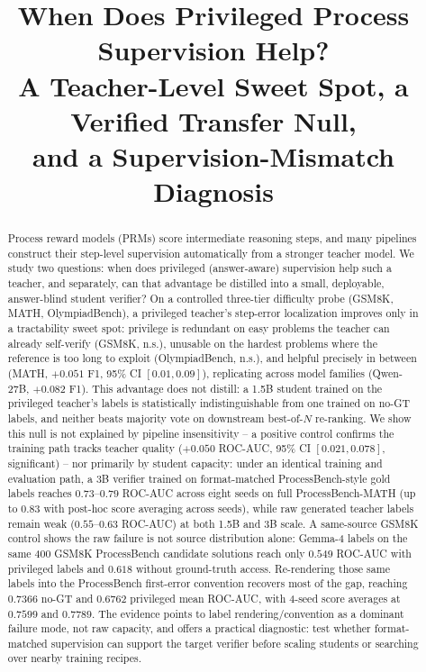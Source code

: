 \documentclass[11pt]{article}
\title{When Does Privileged Process Supervision Help?\\
A Teacher-Level Sweet Spot, a Verified Transfer Null,\\
and a Supervision-Mismatch Diagnosis}
\author{\todo{author list -- anonymize per venue if double-blind}}
\date{}
\begin{document}
\maketitle

\begin{abstract}
Process reward models (PRMs) score intermediate reasoning steps, and many
pipelines construct their step-level supervision automatically from a
stronger teacher model. We study two questions: when does privileged
(answer-aware) supervision help such a teacher, and separately, can that
advantage be distilled into a small, deployable, answer-blind student
verifier? On a controlled three-tier difficulty probe (GSM8K, MATH,
OlympiadBench), a privileged teacher's step-error localization improves only
in a tractability sweet spot: privilege is redundant on easy problems the
teacher can already self-verify (GSM8K, n.s.), unusable on the hardest
problems where the reference is too long to exploit (OlympiadBench, n.s.),
and helpful precisely in between (MATH, $+0.051$ F1, 95\% CI $[0.01, 0.09]$),
replicating across model families (Qwen-27B, $+0.082$ F1). This advantage does
not distill: a 1.5B student trained on the privileged teacher's labels is
statistically indistinguishable from one trained on no-GT labels, and neither
beats majority vote on downstream best-of-$N$ re-ranking. We show this null is
not explained by pipeline insensitivity -- a positive control confirms the
training path tracks teacher quality ($+0.050$ ROC-AUC, 95\% CI
$[0.021, 0.078]$, significant) -- nor primarily by student capacity: under an
identical training and evaluation path, a 3B verifier trained on
format-matched ProcessBench-style gold labels reaches $0.73$--$0.79$ ROC-AUC
across eight seeds on full ProcessBench-MATH (up to $0.83$ with post-hoc
score averaging across seeds), while raw generated teacher labels remain weak
($0.55$--$0.63$ ROC-AUC) at both 1.5B and 3B scale. A same-source GSM8K
control shows the raw failure is not source distribution alone: Gemma-4 labels
on the same 400 GSM8K ProcessBench candidate solutions reach only $0.549$
ROC-AUC with privileged labels and $0.618$ without ground-truth access.
Re-rendering those same labels into the ProcessBench first-error convention
recovers most of the gap, reaching $0.7366$ no-GT and $0.6762$ privileged
mean ROC-AUC, with 4-seed score averages at $0.7599$ and $0.7789$.
The evidence points to label rendering/convention as a dominant failure mode,
not raw capacity, and offers a practical diagnostic: test whether
format-matched supervision can support the target verifier before scaling
students or searching over nearby training recipes.
\end{abstract}
\end{document}
